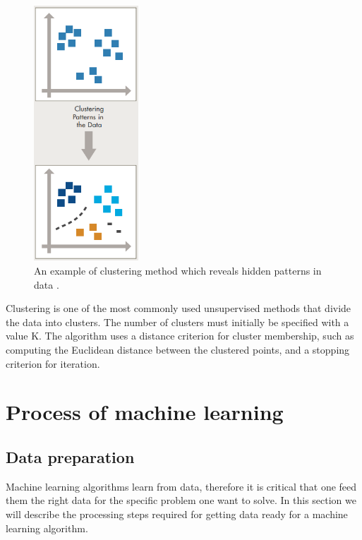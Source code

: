 \begin{figure}[H]
  \centering
    \includegraphics[width=0.35\textwidth]{images/cluster.png}
    \caption{An example of clustering method which reveals hidden patterns in data \citep{Machinelearning}.}
  \label{datagrowth.png}
\end{figure}

Clustering is one of the most commonly used unsupervised methods that divide the data into clusters. The number of clusters must initially be specified with a value K. The algorithm uses a distance
criterion for cluster membership, such as computing the Euclidean distance between the clustered points, and a stopping criterion for iteration\citep{ball2010data}.

\section{Process of machine learning}
\label{Process}
\subsection{Data preparation}
Machine learning algorithms learn from data, therefore it is critical that one feed them the right data for the specific problem one want to solve. In this section we will describe the processing steps required for getting data ready for a machine learning algorithm.

